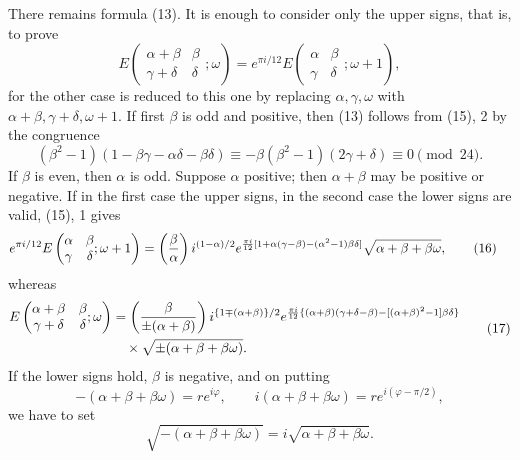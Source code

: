 \documentclass[11pt]{article}
\providecommand{\Jac}[2]{\left(\frac{#1}{#2}\right)}
\begin{document}
There remains formula (13). It is enough to consider only the upper signs, that is, to prove
\[
E\left(\begin{matrix}\alpha+\beta&\beta\\ \gamma+\delta&\delta\end{matrix};\omega\right)
=e^{\pi i/12}E\left(\begin{matrix}\alpha&\beta\\ \gamma&\delta\end{matrix};\omega+1\right),
\]
for the other case is reduced to this one by replacing $\alpha,\gamma,\omega$ with $\alpha+\beta,\gamma+\delta,
\omega+1$. If first $\beta$ is odd and positive, then (13) follows from (15), 2 by the congruence
\[
(\beta^2-1)(1-\beta\gamma-\alpha\delta-\beta\delta)
\equiv-\beta(\beta^2-1)(2\gamma+\delta)\equiv0\pmod{24}.
\]
If $\beta$ is even, then $\alpha$ is odd. Suppose $\alpha$ positive; then $\alpha+\beta$ may be positive or negative. If in the first case the upper signs, in the second case the lower signs are valid, (15), 1 gives
\begin{align}
e^{\pi i/12}E\left(\begin{matrix}\alpha&\beta\\ \gamma&\delta\end{matrix};\omega+1\right)
&=\Jac{\beta}{\alpha}i^{(1-\alpha)/2}
 e^{{\pi i\over12}[1+\alpha(\gamma-\beta)-(\alpha^2-1)\beta\delta]}
\sqrt{\alpha+\beta+\beta\omega}, \tag{16}
\end{align}
whereas
\begin{equation}
\begin{aligned}
E\left(\begin{matrix}\alpha+\beta&\beta\\ \gamma+\delta&\delta\end{matrix};\omega\right)
&=\Jac{\beta}{\pm(\alpha+\beta)}
 i^{\{1\mp(\alpha+\beta)\}/2}
 e^{{\pi i\over12}\{(\alpha+\beta)(\gamma+\delta-\beta)-[(\alpha+\beta)^2-1]\beta\delta\}}\\
&\quad\times \sqrt{\pm(\alpha+\beta+\beta\omega)} .
\end{aligned}
\tag{17}
\end{equation}
If the lower signs hold, $\beta$ is negative, and on putting
\[
-(\alpha+\beta+\beta\omega)=re^{i\varphi},
\qquad
 i(\alpha+\beta+\beta\omega)=re^{i(\varphi-\pi/2)},
\]
we have to set
\[
\sqrt{-(\alpha+\beta+
\beta\omega)}=i\sqrt{\alpha+\beta+\beta\omega}.
\]
\end{document}
